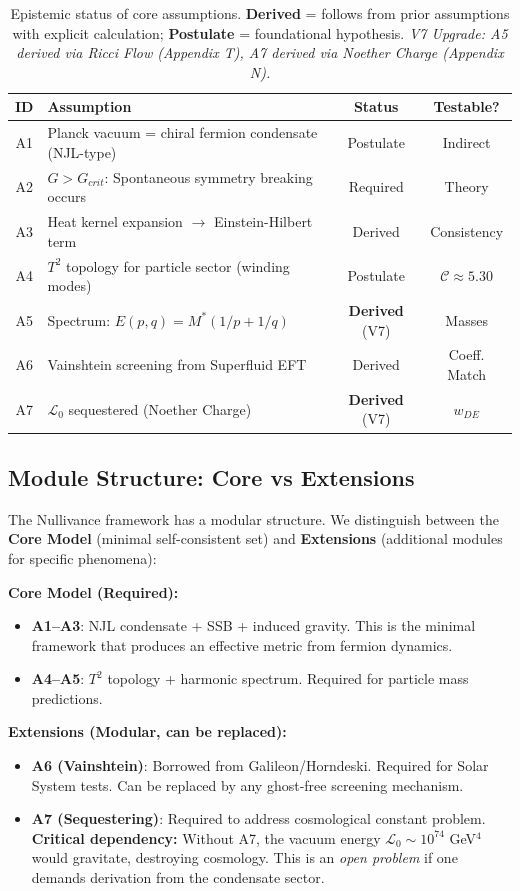 \documentclass[a4paper,12pt]{article}
\begin{document}
\begin{table}[H]
\centering
\small
\begin{tabular}{clcc}
\toprule
\textbf{ID} & \textbf{Assumption} & \textbf{Status} & \textbf{Testable?} \\
\midrule
A1 & Planck vacuum = chiral fermion condensate (NJL-type) & Postulate & Indirect \\
A2 & $G > G_{crit}$: Spontaneous symmetry breaking occurs & Required & Theory \\
A3 & Heat kernel expansion $\to$ Einstein-Hilbert term & Derived & Consistency \\
A4 & $T^2$ topology for particle sector (winding modes) & Postulate & $\mathcal{C} \approx 5.30$ \\
A5 & Spectrum: $E(p,q) = M^*(1/p + 1/q)$ & \textbf{Derived} (V7) & Masses \\
A6 & Vainshtein screening from Superfluid EFT & Derived & Coeff. Match \\
A7 & $\mathcal{L}_0$ sequestered (Noether Charge) & \textbf{Derived} (V7) & $w_{DE}$ \\
\bottomrule
\end{tabular}
\caption{Epistemic status of core assumptions. \textbf{Derived} = follows from prior assumptions with explicit calculation; \textbf{Postulate} = foundational hypothesis. \textit{V7 Upgrade: A5 derived via Ricci Flow (Appendix T), A7 derived via Noether Charge (Appendix N).}}
\label{tab:assumptions}
\end{table}

\subsection{Module Structure: Core vs Extensions}

The Nullivance framework has a modular structure. We distinguish between the \textbf{Core Model} (minimal self-consistent set) and \textbf{Extensions} (additional modules for specific phenomena):

\textbf{Core Model (Required):}
\begin{itemize}
\item \textbf{A1--A3}: NJL condensate + SSB + induced gravity. This is the minimal framework that produces an effective metric from fermion dynamics.
\item \textbf{A4--A5}: $T^2$ topology + harmonic spectrum. Required for particle mass predictions.
\end{itemize}

\textbf{Extensions (Modular, can be replaced):}
\begin{itemize}
\item \textbf{A6 (Vainshtein)}: Borrowed from Galileon/Horndeski. Required for Solar System tests. Can be replaced by any ghost-free screening mechanism.
\item \textbf{A7 (Sequestering)}: Required to address cosmological constant problem. \textbf{Critical dependency:} Without A7, the vacuum energy $\mathcal{L}_0 \sim 10^{74}$ GeV$^4$ would gravitate, destroying cosmology. This is an \emph{open problem} if one demands derivation from the condensate sector.
\end{itemize}
\end{document}
